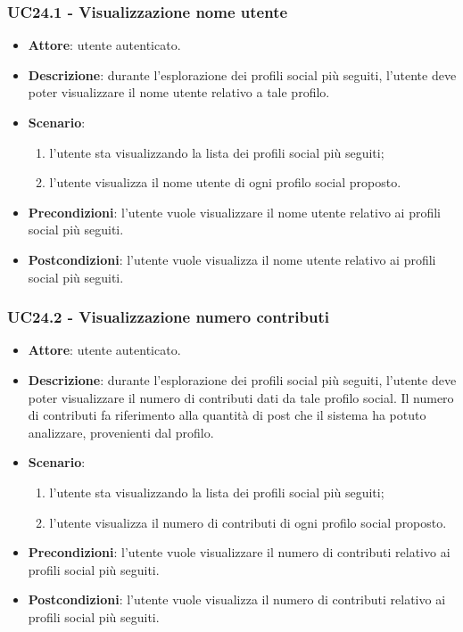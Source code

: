 \subsubsection{UC24.1 - Visualizzazione nome utente}
\begin{itemize}
    \item \textbf{Attore}: utente autenticato.
    \item \textbf{Descrizione}: durante l'esplorazione dei profili social più seguiti,
     l'utente deve poter visualizzare il nome utente relativo a tale profilo.
    \item \textbf{Scenario}:
    \begin{enumerate}
        \item l'utente sta visualizzando la lista dei profili social più seguiti;
        \item l'utente visualizza il nome utente di ogni profilo social proposto.
    \end{enumerate}
    \item \textbf{Precondizioni}: l'utente vuole visualizzare il nome utente relativo ai  profili social più seguiti.
    \item \textbf{Postcondizioni}: l'utente vuole visualizza il nome utente relativo ai  profili social più seguiti.
\end{itemize}

\subsubsection{UC24.2 - Visualizzazione numero contributi}
\begin{itemize}
    \item \textbf{Attore}: utente autenticato.
    \item \textbf{Descrizione}: durante l'esplorazione dei profili social più seguiti,
    l'utente deve poter visualizzare il numero di contributi dati da tale profilo social.
    Il numero di contributi fa riferimento alla quantità di post che il sistema ha potuto
    analizzare, provenienti dal profilo.
    \item \textbf{Scenario}:
    \begin{enumerate}
        \item l'utente sta visualizzando la lista dei profili social più seguiti;
        \item l'utente visualizza il numero di contributi di ogni profilo social proposto.
    \end{enumerate}
    \item \textbf{Precondizioni}: l'utente vuole visualizzare il numero di contributi relativo ai  profili social più seguiti.
    \item \textbf{Postcondizioni}: l'utente vuole visualizza il numero di contributi relativo ai  profili social più seguiti.
\end{itemize}

